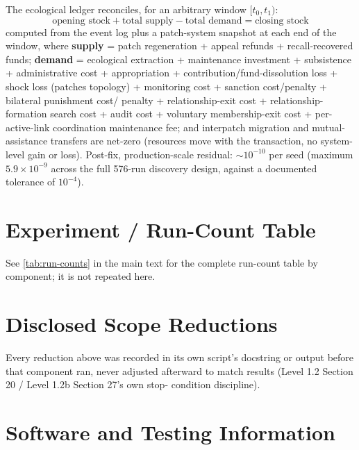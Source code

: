 The ecological ledger reconciles, for an arbitrary window
$[t_0, t_1)$:
\[
\text{opening stock} + \text{total supply} - \text{total demand} = \text{closing stock}
\]
computed from the event log plus a patch-system snapshot at each end of
the window, where \textbf{supply} = patch regeneration + appeal refunds +
recall-recovered funds; \textbf{demand} = ecological extraction +
maintenance investment + subsistence + administrative cost + appropriation
+ contribution/fund-dissolution loss + shock loss (patches topology) +
monitoring cost + sanction cost/penalty + bilateral punishment cost/
penalty + relationship-exit cost + relationship-formation search cost +
audit cost + voluntary membership-exit cost + per-active-link coordination
maintenance fee; and interpatch migration and mutual-assistance transfers
are net-zero (resources move with the transaction, no system-level gain or
loss). Post-fix, production-scale residual: $\sim10^{-10}$ per seed
(maximum $5.9\times10^{-9}$ across the full 576-run discovery design,
against a documented tolerance of $10^{-4}$).

\clearpage
\section{Experiment / Run-Count Table}
\label{sec:appendix-run-counts}

See \cref{tab:run-counts} in the main text for the complete run-count
table by component; it is not repeated here.

\clearpage
\section{Disclosed Scope Reductions}
\label{sec:appendix-scope-reductions}

\begin{table}[htbp]
\centering
\caption{Every disclosed scope reduction carried by Level 1.2 or Level
1.2b, recorded before the affected component ran.}
\label{tab:scope-reductions}

\medskip
\noindent\footnotesize Every reduction above was recorded in its own script's
docstring or output before that component ran, never adjusted afterward to
match results (Level 1.2 Section 20 / Level 1.2b Section 27's own stop-
condition discipline).
\normalsize
\end{table}

\clearpage
\section{Software and Testing Information}
\label{sec:appendix-software}

